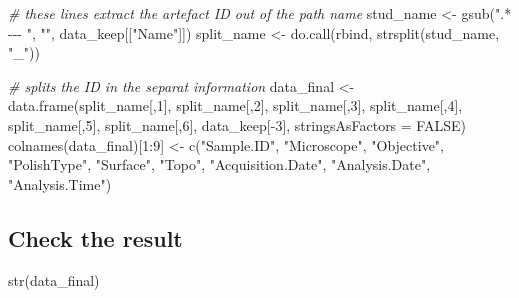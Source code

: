 \documentclass[
]{article}
\newenvironment{Shaded}{\begin{snugshade}}{\end{snugshade}}
\newcommand{\AttributeTok}[1]{\textcolor[rgb]{0.77,0.63,0.00}{#1}}
\newcommand{\CommentTok}[1]{\textcolor[rgb]{0.56,0.35,0.01}{\textit{#1}}}
\newcommand{\ConstantTok}[1]{\textcolor[rgb]{0.00,0.00,0.00}{#1}}
\newcommand{\DecValTok}[1]{\textcolor[rgb]{0.00,0.00,0.81}{#1}}
\newcommand{\FunctionTok}[1]{\textcolor[rgb]{0.00,0.00,0.00}{#1}}
\newcommand{\NormalTok}[1]{#1}
\newcommand{\OtherTok}[1]{\textcolor[rgb]{0.56,0.35,0.01}{#1}}
\newcommand{\SpecialCharTok}[1]{\textcolor[rgb]{0.00,0.00,0.00}{#1}}
\newcommand{\StringTok}[1]{\textcolor[rgb]{0.31,0.60,0.02}{#1}}
\begin{document}
\begin{Shaded}
\begin{Highlighting}[]
\CommentTok{\# these lines extract the artefact ID out of the path name}
\NormalTok{stud\_name }\OtherTok{\textless{}{-}} \FunctionTok{gsub}\NormalTok{(}\StringTok{".* {-}{-}{-} "}\NormalTok{, }\StringTok{""}\NormalTok{, data\_keep[[}\StringTok{"Name"}\NormalTok{]])}
\NormalTok{split\_name }\OtherTok{\textless{}{-}} \FunctionTok{do.call}\NormalTok{(rbind, }\FunctionTok{strsplit}\NormalTok{(stud\_name, }\StringTok{"\_"}\NormalTok{))}

\CommentTok{\# splits the ID in the separat information }
\NormalTok{data\_final }\OtherTok{\textless{}{-}} \FunctionTok{data.frame}\NormalTok{(split\_name[,}\DecValTok{1}\NormalTok{], split\_name[,}\DecValTok{2}\NormalTok{], split\_name[,}\DecValTok{3}\NormalTok{], split\_name[,}\DecValTok{4}\NormalTok{], split\_name[,}\DecValTok{5}\NormalTok{], split\_name[,}\DecValTok{6}\NormalTok{], data\_keep[}\SpecialCharTok{{-}}\DecValTok{3}\NormalTok{], }\AttributeTok{stringsAsFactors =} \ConstantTok{FALSE}\NormalTok{)}
\FunctionTok{colnames}\NormalTok{(data\_final)[}\DecValTok{1}\SpecialCharTok{:}\DecValTok{9}\NormalTok{] }\OtherTok{\textless{}{-}} \FunctionTok{c}\NormalTok{(}\StringTok{"Sample.ID"}\NormalTok{, }\StringTok{"Microscope"}\NormalTok{, }\StringTok{"Objective"}\NormalTok{, }\StringTok{"PolishType"}\NormalTok{, }\StringTok{"Surface"}\NormalTok{, }\StringTok{"Topo"}\NormalTok{, }\StringTok{"Acquisition.Date"}\NormalTok{, }\StringTok{"Analysis.Date"}\NormalTok{, }\StringTok{"Analysis.Time"}\NormalTok{)}
\end{Highlighting}
\end{Shaded}

\hypertarget{check-the-result}{%
\subsection{Check the result}\label{check-the-result}}

\begin{Shaded}
\begin{Highlighting}[]
\FunctionTok{str}\NormalTok{(data\_final)}
\end{Highlighting}
\end{Shaded}
\end{document}
